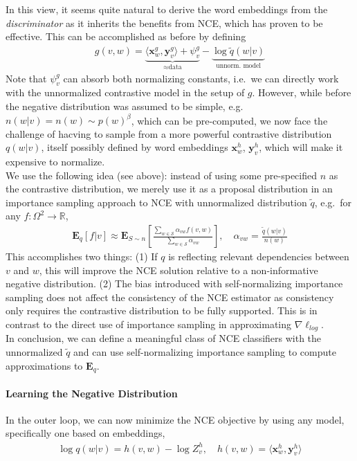 \documentclass{article}
\renewcommand{\Re}{{\mathbb R}}
\newcommand{\E}{{\mathbf E}}
\renewcommand{\S}{{\mathcal S}}
\newcommand{\x}{{\mathbf x}}
\newcommand{\y}{{\mathbf y}}
\begin{document}
In this view, it seems quite natural to derive the word embeddings from the \textit{discriminator} as it inherits the benefits from NCE, which has proven to be effective. This can be accomplished as before by defining 
\begin{align}
g(v,w) = \underbrace{\langle \x_w^g, \y_v^g\rangle + \psi_v^g}_{\approx \text{data}} - \underbrace{\log \tilde q(w|v)}_{\text{unnorm.~model}}
\end{align}
Note that $\psi^g_v$ can absorb both normalizing constants, i.e.~we can directly work with the unnormalized contrastive model in the setup of $g$. However, while before the negative distribution was assumed to be simple, e.g.~$n(w|v) = n(w) \sim p(w)^\beta$, which can be pre-computed, we now face the challenge of hacving to sample from a more powerful contrastive distribution $q(w|v)$, itself possibly defined by word embeddings $\x_w^h$, $\y_v^h$, which will  make it  expensive to normalize. \\

We use the following idea (see above): instead of using some pre-specified $n$ as the contrastive distribution, we merely use it as a proposal distribution in an importance sampling approach to NCE with unnormalized distribution $\tilde q$, e.g.~for any $f: \Omega^2 \to \Re$, 
\begin{align}
\E_q[f |  v] \approx \E_{S \sim n} \left[ \frac{ \sum_{w \in \S} \alpha_{vw} f(v,w)}{\sum_{w \in \S} \alpha_{vw}} \right], \quad 
\alpha_{vw} = \frac{\tilde q(w|v)}{n(w)}
\end{align}
This accomplishes two things: (1) If $q$ is reflecting relevant dependencies between $v$ and $w$, this will improve the NCE solution relative to a non-informative negative distribution. (2) The bias introduced with self-normalizing importance sampling does not affect the consistency of the NCE estimator as consistency only requires the contrastive distribution to be fully supported. This is in contrast to the direct use of importance sampling in approximating $\nabla \ell_{log}$. \\

In conclusion, we can define a meaningful class of NCE classifiers with the unnormalized $\tilde q$ and can use self-normalizing importance sampling to compute approximations to $\E_q$. 

\paragraph{Learning the Negative Distribution}
In the outer loop, we can now minimize the NCE objective by using any model, specifically one based on embeddings, 
\begin{align}
\log q(w|v) = h(v,w) - \log Z^h_v, \quad h(v,w) = \langle \x_w^h, \y_v^h \rangle
\end{align}
\end{document}
